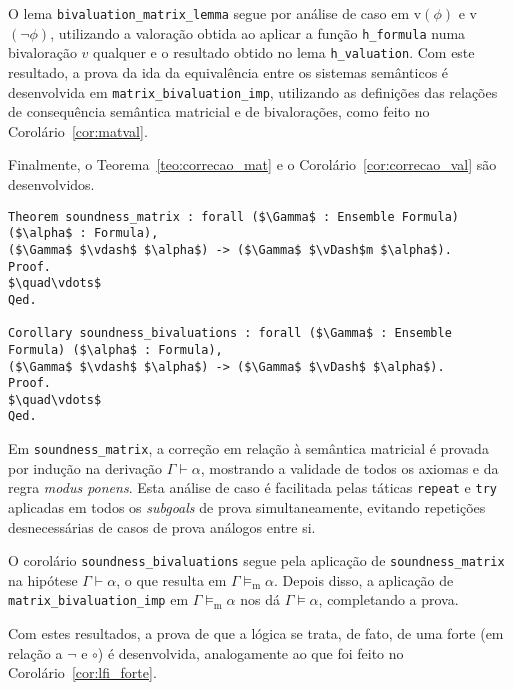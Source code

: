         O lema \texttt{bivaluation\_matrix\_lemma} segue por análise de caso em v$(\phi)$ e v$(\neg \phi)$, utilizando a valoração obtida ao aplicar a função \texttt{h\_formula} numa bivaloração $v$ qualquer e o resultado obtido no lema \texttt{h\_valuation}. Com este resultado, a prova da ida da equivalência entre os sistemas semânticos é desenvolvida em \texttt{matrix\_bivaluation\_imp}, utilizando as definições das relações de consequência semântica matricial e de bivalorações, como feito no Corolário~\ref{cor:matval}.

        Finalmente, o Teorema~\ref{teo:correcao_mat} e o Corolário~\ref{cor:correcao_val} são desenvolvidos.

        \begin{lstlisting}[name=Soundness, frame=single, language=coq]
Theorem soundness_matrix : forall ($\Gamma$ : Ensemble Formula) ($\alpha$ : Formula), 
($\Gamma$ $\vdash$ $\alpha$) -> ($\Gamma$ $\vDash$m $\alpha$).
Proof.
$\quad\vdots$
Qed.

Corollary soundness_bivaluations : forall ($\Gamma$ : Ensemble Formula) ($\alpha$ : Formula), 
($\Gamma$ $\vdash$ $\alpha$) -> ($\Gamma$ $\vDash$ $\alpha$).
Proof.
$\quad\vdots$
Qed.
        \end{lstlisting}

        Em \texttt{soundness\_matrix}, a correção em relação à semântica matricial é provada por indução na derivação $\Gamma \vdash \alpha$, mostrando a validade de todos os axiomas e da regra \textit{modus ponens}. Esta análise de caso é facilitada pelas táticas \texttt{repeat} e \texttt{try} aplicadas em todos os \textit{subgoals} de prova simultaneamente, evitando repetições desnecessárias de casos de prova análogos entre si.

        O corolário \texttt{soundness\_bivaluations} segue pela aplicação de \texttt{soundness\_matrix} na hipótese $\Gamma \vdash \alpha$, o que resulta em $\Gamma \vDash_\text{m}\alpha$. Depois disso, a aplicação de \texttt{matrix\_bivaluation\_imp} em $\Gamma \vDash_\text{m}\alpha$ nos dá $\Gamma \vDash \alpha$, completando a prova.

        Com estes resultados, a prova de que a lógica \lfium{} se trata, de fato, de uma \lfi{} forte (em relação a $\neg$ e $\circ$) é desenvolvida, analogamente ao que foi feito no Corolário~\ref{cor:lfi_forte}.

